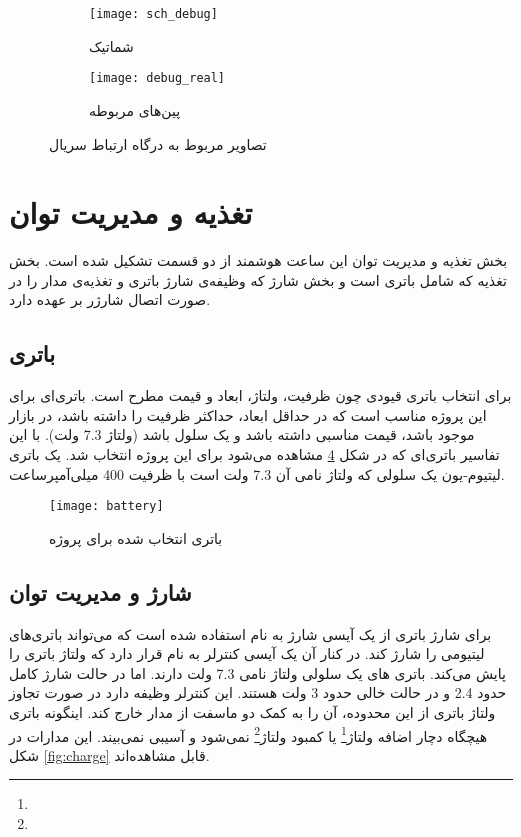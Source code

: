 \begin{figure}[h]
	\centering
	\begin{subfigure}{0.59\textwidth}
		\centering
		\texttt{[image: sch\_debug]}
		\caption{شماتیک}
		\label{fig:sch_debug}
	\end{subfigure}
	\begin{subfigure}{0.4\textwidth}
		\centering
		\texttt{[image: debug\_real]}
		\caption{پین‌های مربوطه}
		\label{fig:debug_real}
	\end{subfigure}
	\caption{تصاویر مربوط به درگاه ارتباط سریال}
\end{figure}

\section{تغذیه و مدیریت توان}
بخش تغذیه و مدیریت توان این ساعت هوشمند از دو قسمت تشکیل شده است. بخش تغذیه که شامل باتری است و بخش شارژ که وظیفه‌ی شارژ باتری و تغذیه‌ی مدار را در صورت اتصال شارژر بر عهده دارد.

\subsection{باتری}
برای انتخاب باتری قیودی چون ظرفیت، ولتاژ، ابعاد و قیمت مطرح است. باتری‌ای برای این پروژه مناسب است که در حداقل ابعاد، حداکثر ظرفیت را داشته باشد، در بازار موجود باشد، قیمت مناسبی داشته باشد و یک سلول باشد (ولتاژ 7.3 ولت). با این تفاسیر باتری‌ای که در شکل \ref{fig:battery} مشاهده می‌شود برای این پروژه انتخاب شد. یک باتری لیتیوم-یون یک سلولی که ولتاژ نامی آن 7.3 ولت است با ظرفیت 400 میلی‌آمپرساعت.

\begin{figure}[h]
	\centering
	\texttt{[image: battery]}
	\caption{باتری انتخاب شده برای پروژه}
	\label{fig:battery}
\end{figure}

\subsection{شارژ و مدیریت توان}
برای شارژ باتری از یک آیسی شارژ به نام  استفاده شده است که می‌تواند باتری‌های لیتیومی را شارژ کند. در کنار آن یک آیسی کنترلر به نام  قرار دارد که ولتاژ باتری را پایش می‌کند. باتری های یک سلولی ولتاژ نامی 7.3 ولت دارند. اما در حالت شارژ کامل حدود 2.4 و در حالت خالی حدود 3 ولت هستند. این کنترلر وظیفه دارد در صورت تجاوز ولتاژ باتری از این محدوده، آن را به کمک دو ماسفت از مدار خارج کند. اینگونه باتری هیچگاه دچار اضافه ولتاژ\footnote{} یا کمبود ولتاژ\footnote{} نمی‌شود و آسیبی نمی‌بیند. این مدارات در شکل \ref{fig:charge} قابل مشاهده‌اند.

